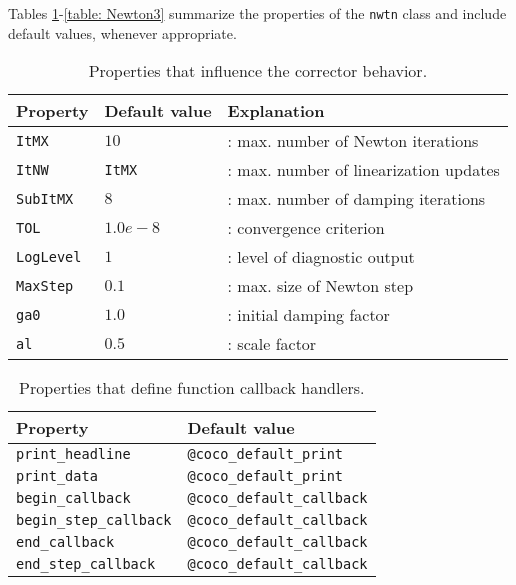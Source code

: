 \documentclass{article}
\begin{document}
\noindent Tables \ref{table: Newton1}-\ref{table: Newton3} summarize the
properties of the \texttt{nwtn} class and include default values, whenever
appropriate.

\begin{table}[h]
\caption{Properties that influence the corrector behavior.}
\label{table: Newton1}\centering%
\begin{tabular}{|lll|}
\hline
Property & Default value & Explanation \\ \hline
\texttt{ItMX} & $10$ & : max. number of Newton iterations \\ 
\texttt{ItNW} & \texttt{ItMX} & : max. number of linearization updates \\ 
\texttt{SubItMX} & $8$ & : max. number of damping iterations \\ 
\texttt{TOL} & $1.0e-8$ & : convergence criterion \\ 
\texttt{LogLevel} & $1$ & : level of diagnostic output \\ 
\texttt{MaxStep} & $0.1$ & : max. size of Newton step \\ 
\texttt{ga0} & $1.0$ & : initial damping factor \\ 
\texttt{al} & $0.5$ & : scale factor \\ \hline
\end{tabular}%
\end{table}

\begin{table}[h]
\caption{Properties that define function callback handlers.}
\label{table: Newton2}\centering%
\begin{tabular}{|ll|}
\hline
Property & Default value \\ \hline
\texttt{print\_headline} & \texttt{@coco\_default\_print} \\ 
\texttt{print\_data} & \texttt{@coco\_default\_print} \\ 
\texttt{begin\_callback} & \texttt{@coco\_default\_callback} \\ 
\texttt{begin\_step\_callback} & \texttt{@coco\_default\_callback} \\ 
\texttt{end\_callback} & \texttt{@coco\_default\_callback} \\ 
\texttt{end\_step\_callback} & \texttt{@coco\_default\_callback} \\ \hline
\end{tabular}%
\end{table}
\end{document}
